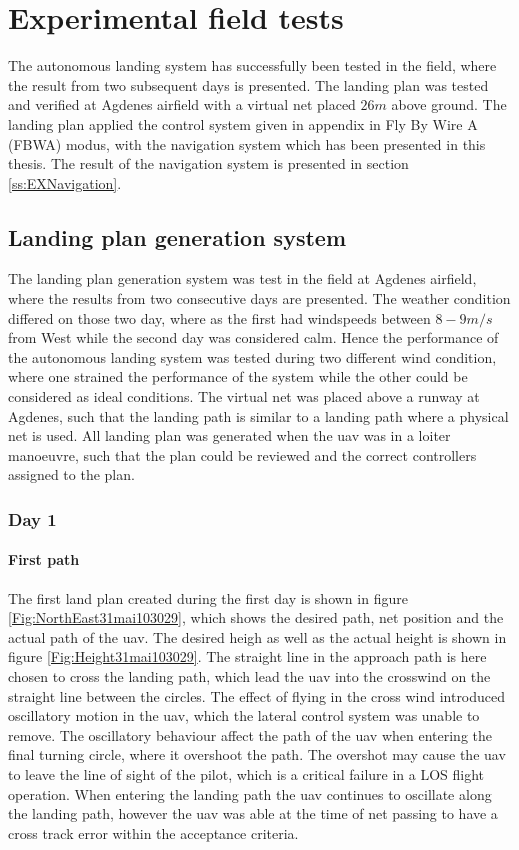 \chapter{Experimental field tests}\label{Ch:ExperimentalTesting}
The autonomous landing system has successfully been tested in the field, where the result from two subsequent days is presented. The landing plan was tested and verified at Agdenes airfield with a virtual net placed $26 m$ above ground. The landing plan applied the control system given in appendix \citep{AP:ControlGuidanceSystem} in Fly By Wire A (FBWA) modus, with the navigation system which has been presented in this thesis. The result of the navigation system is presented in section \ref{ss:EXNavigation}.
\section{Landing plan generation system}
The landing plan generation system was test in the field at Agdenes airfield, where the results from two consecutive days are presented. The weather condition differed on those two day, where as the first had windspeeds between $8-9 m/s$ from West while the second day was considered calm. Hence the performance of the autonomous landing system was tested during two different wind condition, where one strained the performance of the system while the other could be considered as ideal conditions. The virtual net was placed above a runway at Agdenes, such that the landing path is similar to a landing path where a physical net is used. All landing plan was generated when the \gls{uav} was in a loiter manoeuvre, such that the plan could be reviewed and the correct controllers assigned to the plan.
\subsection{Day 1}
\subsubsection{First path}
The first land plan created during the first day is shown in figure \ref{Fig:NorthEast31mai103029}, which shows the desired path, net position and the actual path of the \gls{uav}. The desired heigh as well as the actual height is shown in figure \ref{Fig:Height31mai103029}. The straight line in the approach path is here chosen to cross the landing path, which lead the \gls{uav} into the crosswind on the straight line between the circles. The effect of flying in the cross wind introduced oscillatory motion in the \gls{uav}, which the lateral control system was unable to remove. The oscillatory behaviour affect the path of the \gls{uav} when entering the final turning circle, where it overshoot the path. The overshot may cause the \gls{uav} to leave the line of sight of the pilot, which is a critical failure in a LOS flight operation. When entering the landing path the \gls{uav} continues to oscillate along the landing path, however the \gls{uav} was able at the time of net passing to have a cross track error within the acceptance criteria.

